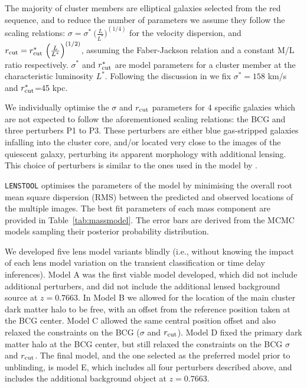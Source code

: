 \documentclass[12pt,dvipsnames]{article}
\def\lenstool{{\tt LENSTOOL}\xspace}
\begin{document}
The majority of cluster members are elliptical galaxies selected from the red sequence, and to reduce the number of parameters we assume they follow the scaling relations: $\sigma=\sigma^*\ {\Big(\frac{L}{L^*}\Big)}^{(1/4)}$ for the velocity dispersion, 
and $r_{\rm cut}=r_{\rm cut}^*\ {\Big(\frac{L}{L^*}\Big)}^{(1/2)}$, assuming the Faber-Jackson relation and a constant M/L ratio respectively. $\sigma^*$ and $r^*_{\rm cut}$ are model parameters for a cluster member at the characteristic luminosity $L^*$.  Following the discussion in \cite{richard_locuss_2010} we fix $\sigma^*=158$ km/s and $r_{\rm cut}^*$=45 kpc. 

We individually optimise the $\sigma$ and $r_{\rm cut}$ parameters for 4 specific galaxies which are not expected to follow the aforementioned scaling relations: the BCG and three perturbers P1 to P3. These perturbers are either blue gas-stripped galaxies infalling into the cluster core, and/or located very close to the images of the quiescent galaxy, perturbing its apparent morphology with additional lensing. This choice of perturbers is similar to the ones used in the model by \cite{newman_resolving_2018}.

\lenstool optimises the parameters of the model by minimising the overall root mean square dispersion (RMS) between the predicted and observed locations of the multiple images. The best fit parameters of each mass component are provided in Table~\ref{tab:massmodel}. The error bars are derived from the MCMC models sampling their posterior probability distribution. 

We developed five lens model variants blindly (i.e., without knowing the impact of each lens model variation on the transient classification or time delay inferences). Model A was the first viable model developed, which did not include additional perturbers, and did not include the additional lensed background source at $z=0.7663$.   In Model B we allowed for the location of the main cluster dark matter halo to be free, with an offset from the reference position taken at the BCG center.  Model C allowed the same central position offset and also relaxed the constraints on the BCG ($\sigma$ and $r_{\rm cut}$).  Model D fixed the primary dark matter halo at the BCG center, but still relaxed the constraints on the BCG $\sigma$ and $r_{\rm cut}$.
The final model, and the one selected as the preferred model prior to unblinding, is model E, which includes all four perturbers described above, and includes the additional background object at $z=0.7663$.
\end{document}
